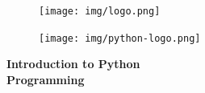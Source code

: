 \documentclass[article,A4,12pt]{llncs}
\begin{document}

\pagestyle{empty}

\vbox{}
\begin{figure}[!ht]
\texttt{[image: img/logo.png]}
\vspace{10mm}
\end{figure}
\vbox{}
\vspace{0.5cm}


\begin{figure}[!ht]
\begin{center}
\vspace{-6mm}
\texttt{[image: img/python-logo.png]}
\vbox{}
\vspace{-9mm}
\end{center}
\end{figure}
\begin{center}
\vspace{2cm}
{\huge \bf Introduction to Python\\ Programming}
\end{center}
\end{document}
